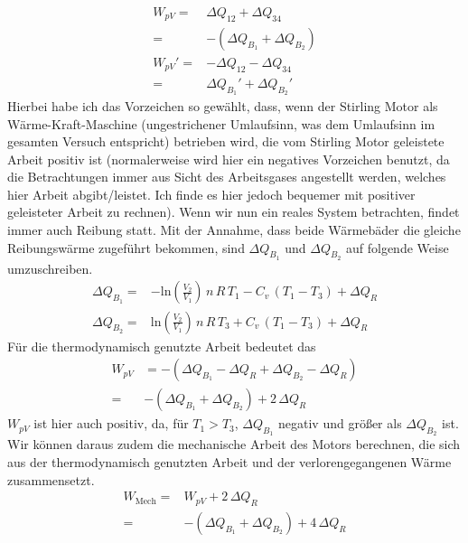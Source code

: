 \documentclass[a4paper, 12pt,]{scrartcl}
\begin{document}
\begin{align*}W_{pV}=&\Delta{Q}_{12}+\Delta{Q_{34}}\\
=&-(\Delta{Q_{B_1}}+\Delta{Q_{B_2}})\\
W_{pV}'=&-\Delta{Q}_{12}-\Delta{Q_{34}}\\
=&\Delta{Q_{B_1}}'+\Delta{Q_{B_2}}'\end{align*}
Hierbei habe ich das Vorzeichen so gewählt, dass, wenn der Stirling Motor als Wärme-Kraft-Maschine (ungestrichener Umlaufsinn, was dem Umlaufsinn im gesamten Versuch entspricht) betrieben wird, die vom Stirling Motor geleistete Arbeit positiv ist (normalerweise wird hier ein negatives Vorzeichen benutzt, da die Betrachtungen immer aus Sicht des Arbeitsgases angestellt werden, welches hier Arbeit abgibt/leistet. Ich finde es hier jedoch bequemer mit positiver geleisteter Arbeit zu rechnen). Wenn wir nun ein reales System betrachten, findet immer auch Reibung statt. Mit der Annahme, dass beide Wärmebäder die gleiche Reibungswärme zugeführt bekommen, sind $\Delta{Q_{B_1}}$ und $\Delta{Q_{B_2}}$ auf folgende Weise umzuschreiben.
\begin{align*}\Delta{Q_{B_1}}=&-\text{ln}\left(\frac{V_2}{V_1}\right)\,n\,R\,T_1-C_v\,(T_1-T_3)+\Delta{Q_R}\\
\Delta{Q_{B_2}}=&\text{ln}\left(\frac{V_2}{V_1}\right)\,n\,R\,T_3+C_v\,(T_1-T_3)+\Delta{Q_R}\end{align*}
Für die thermodynamisch genutzte Arbeit bedeutet das
\begin{align*}W_{pV}&=-(\Delta{Q_{B_1}}-\Delta{Q_R}+\Delta{Q_{B_2}}-\Delta{Q_R})\\
=&-(\Delta{Q_{B_1}}+\Delta{Q_{B_2}})+2\,\Delta{Q_R}\end{align*}
$W_{pV}$ ist hier auch positiv, da, für $T_1>T_3$, $\Delta{Q_{B_1}}$ negativ und größer als $\Delta{Q_{B_2}}$ ist.
Wir können daraus zudem die mechanische Arbeit des Motors berechnen, die sich aus der thermodynamisch genutzten Arbeit und der verlorengegangenen Wärme zusammensetzt.
\begin{align*}W_\text{Mech}=&W_{pV}+2\,\Delta{Q_R}\\=&-(\Delta{Q_{B_1}}+\Delta{Q_{B_2}})+4\,\Delta{Q_R}\end{align*}

\newpage
\end{document}
